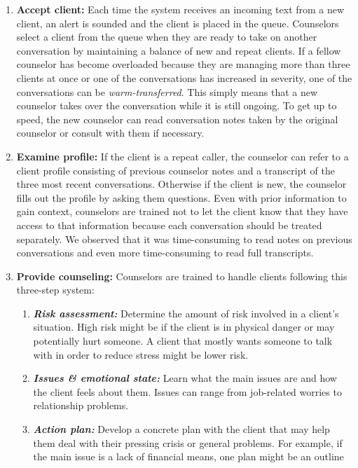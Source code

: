 \begin{enumerate}
  \item \textbf{Accept client:} Each time the system receives an incoming text from a new
  client, an alert is sounded and the client is placed in the queue. Counselors select
  a client from the queue when they are ready to take on another conversation
  by maintaining a balance of new and repeat clients. If a fellow counselor has
  become overloaded because they are managing more than three clients at once
  or one of the conversations has increased in severity, one of the conversations
  can be \textit{warm-transferred}. This simply means that a new counselor takes over
  the conversation while it is still ongoing. To get up to speed, the new counselor
  can read conversation notes taken by the original counselor or consult with them
  if necessary.
  \item \textbf{Examine profile:} If the client is a repeat caller, the counselor can refer to a
  client profile consisting of previous counselor notes and a transcript of the three
  most recent conversations. Otherwise if the client is new, the counselor fills
  out the profile by asking them questions. Even with prior information to gain
  context, counselors are trained not to let the client know that they have access
  to that information because each conversation should be treated separately. We
  observed that it was time-consuming to read notes on previous conversations
  and even more time-consuming to read full transcripts.
  \item \textbf{Provide counseling:} Counselors are trained to handle clients following this
  three-step system:
  \begin{enumerate}
    \item \textbf{\textit{Risk assessment:}} Determine the amount of risk involved in a client's
    situation. High risk might be if the client is in physical danger or may
    potentially hurt someone. A client that mostly wants someone to talk
    with in order to reduce stress might be lower risk.
    \item \textbf{\textit{Issues \& emotional state:}} Learn what the main issues are and how
    the client feels about them. Issues can range from job-related worries to
    relationship problems.
    \item \textbf{\textit{Action plan:}} Develop a concrete plan with the client that may help
    them deal with their pressing crisis or general problems. For example, if
    the main issue is a lack of financial means, one plan might be an outline

\end{enumerate}
\end{enumerate}
